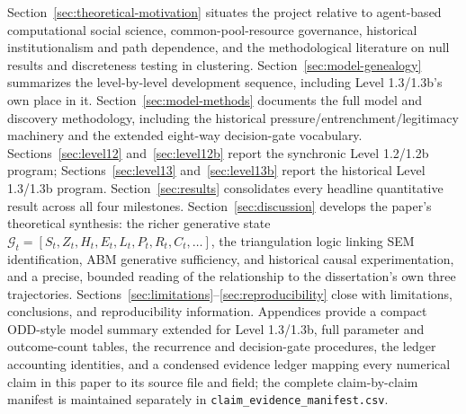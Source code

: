 Section~\ref{sec:theoretical-motivation} situates the project relative to
agent-based computational social science, common-pool-resource governance,
historical institutionalism and path dependence, and the methodological
literature on null results and discreteness testing in clustering.
Section~\ref{sec:model-genealogy} summarizes the level-by-level development
sequence, including Level 1.3/1.3b's own place in it.
Section~\ref{sec:model-methods} documents the full model and discovery
methodology, including the historical pressure/entrenchment/legitimacy
machinery and the extended eight-way decision-gate vocabulary.
Sections~\ref{sec:level12} and~\ref{sec:level12b} report the synchronic
Level 1.2/1.2b program; Sections~\ref{sec:level13}
and~\ref{sec:level13b} report the historical Level 1.3/1.3b program.
Section~\ref{sec:results} consolidates every headline quantitative result
across all four milestones. Section~\ref{sec:discussion} develops the
paper's theoretical synthesis: the richer generative state
$\mathcal{G}_t = [S_t, Z_t, H_t, E_t, L_t, P_t, R_t, C_t, \ldots]$, the
triangulation logic linking SEM identification, ABM generative sufficiency,
and historical causal experimentation, and a precise, bounded reading of
the relationship to the dissertation's own three trajectories.
Sections~\ref{sec:limitations}--\ref{sec:reproducibility} close with
limitations, conclusions, and reproducibility information. Appendices
provide a compact ODD-style model summary extended for Level 1.3/1.3b, full
parameter and outcome-count tables, the recurrence and decision-gate
procedures, the ledger accounting identities, and a condensed evidence
ledger mapping every numerical claim in this paper to its source file and
field; the complete claim-by-claim manifest is maintained separately in
\texttt{claim\_evidence\_manifest.csv}.
